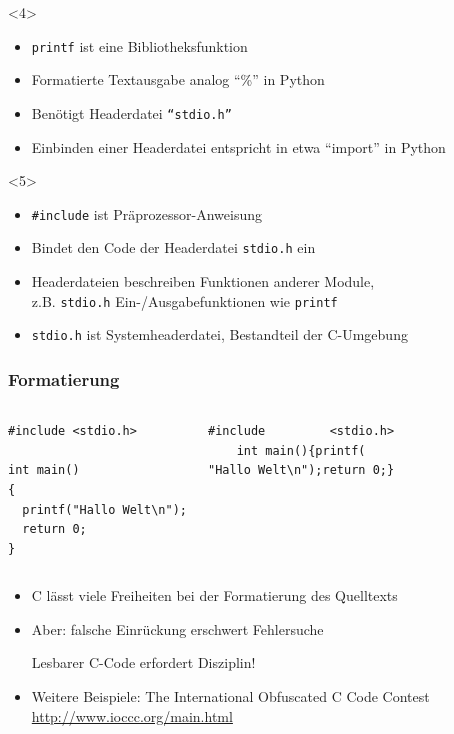\documentclass{slides}
\begin{document}
\begin{frame}[fragile]
  \begin{onlyenv}<4>
    \begin{itemize}
    \item \lstinline!printf! ist eine Bibliotheksfunktion
    \item Formatierte Textausgabe analog "`\%"' in Python
    \item Benötigt Headerdatei \texttt{"`stdio.h"'}
    \item Einbinden einer Headerdatei entspricht in etwa "`import"' in Python
    \end{itemize}
  \end{onlyenv}

  \begin{onlyenv}<5>
    \begin{itemize}
    \item \lstinline!#include! ist \alert{Präprozessor-Anweisung}
    \item Bindet den Code der \alert{Headerdatei} \lstinline!stdio.h! ein
    \item Headerdateien beschreiben Funktionen anderer Module,\\
      z.B. \lstinline!stdio.h! Ein-/Ausgabefunktionen wie
      \lstinline!printf!
    \item \lstinline!stdio.h! ist Systemheaderdatei,
      Bestandteil der C-Umgebung
    \end{itemize}
  \end{onlyenv}
\end{frame}

\begin{frame}[fragile]
  \frametitle{Formatierung}
  \vspace{-\baselineskip}

  \begin{columns}[t,onlytextwidth]
\begin{lstlisting}
#include <stdio.h>

int main()
{
  printf("Hallo Welt\n");
  return 0;
}
\end{lstlisting}
\begin{lstlisting}
#include         <stdio.h>
    int main(){printf(
"Hallo Welt\n");return 0;}
\end{lstlisting}   
  \end{columns}

  \begin{itemize}
  \item C lässt viele Freiheiten bei der Formatierung des Quelltexts
  \item Aber: falsche Einrückung erschwert Fehlersuche
    \begin{alertbox}{0.7\textwidth}
      Lesbarer C-Code erfordert Disziplin!
    \end{alertbox}
    \vspace{0.5em}

  \item Weitere Beispiele: The International Obfuscated C Code Contest\\
    \url{http://www.ioccc.org/main.html}
  \end{itemize}
\end{frame}
\end{document}
